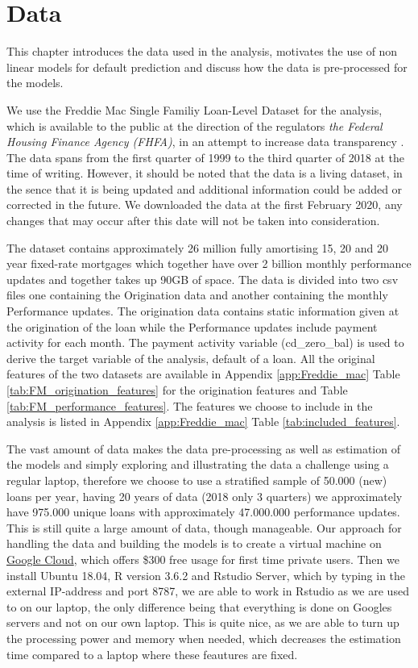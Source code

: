 \chapter{Data}\label{ch:2}
This chapter introduces the data used in the analysis, motivates the use of non linear models for default prediction and discuss how the data is pre-processed for the models. 

We use the Freddie Mac Single Familiy Loan-Level Dataset for the analysis, which is available to the public at the direction of the regulators \textit{the Federal Housing Finance Agency (FHFA)}, in an attempt to increase data transparency \cite[p. 3]{Freddie_mac_guide}. The data spans from the first quarter of 1999 to the third quarter of 2018 at the time of writing. However, it should be noted that the data is a living dataset, in the sence that it is being updated and additional information could be added or corrected in the future. We downloaded the data at the first February 2020, any changes that may occur after this date will not be taken into consideration. 

The dataset contains approximately 26 million  fully amortising 15, 20 and 20 year fixed-rate mortgages which together have over 2 billion monthly performance updates and together takes up 90GB of space. The data is divided into two csv files one containing the Origination data and another containing the monthly Performance updates. The origination data contains static information given at the origination of the loan while the Performance updates include payment activity for each month. The payment activity variable (cd\_zero\_bal) is used to derive the target variable of the analysis, default of a loan. All the original features of the two datasets are available in Appendix \ref{app:Freddie_mac} Table \vref{tab:FM_origination_features} for the origination features and Table \vref{tab:FM_performance_features}. The features we choose to include in the analysis is listed in Appendix \ref{app:Freddie_mac} Table \vref{tab:included_features}.

The vast amount of data makes the data pre-processing as well as estimation of the models and simply exploring and illustrating the data a challenge using a regular laptop, therefore we choose to use a stratified sample of 50.000 (new) loans per year, having 20 years of data (2018 only 3 quarters) we approximately have 975.000 unique loans with approximately 47.000.000 performance updates. This is still quite a large amount of data, though manageable.  
Our approach for handling the data and building the models is to create a virtual machine on \href{https://cloud.google.com/}{Google Cloud}, which offers \$300 free usage for first time private users. Then we install Ubuntu 18.04, R version 3.6.2 and Rstudio Server, which by typing in the external IP-address and port 8787, we are able to work in Rstudio as we are used to on our laptop, the only difference being that everything is done on Googles servers and not on our own laptop. This is quite nice, as we are able to turn up the processing power and memory when needed, which decreases the estimation time compared to a laptop where these feautures are fixed.

